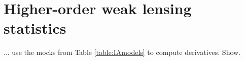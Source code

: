 \section{Higher-order weak lensing statistics}
\label{sec:HOWLS}

... use the mocks from Table \ref{table:IAmodels} to compute derivatives. Show.
